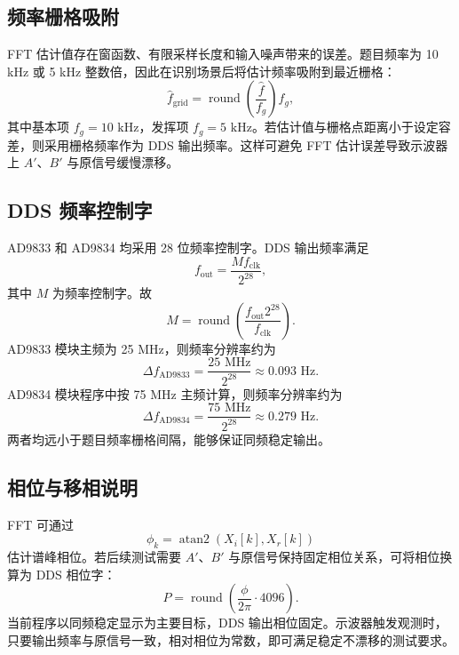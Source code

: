 \documentclass[UTF8,a4paper,zihao=-4]{ctexart}
\begin{document}
\subsection{频率栅格吸附}

FFT 估计值存在窗函数、有限采样长度和输入噪声带来的误差。题目频率为 10 kHz 或 5 kHz 整数倍，因此在识别场景后将估计频率吸附到最近栅格：
\begin{equation}
  \hat f_{\text{grid}}=\operatorname{round}\left(\frac{\hat f}{f_g}\right)f_g,
\end{equation}
其中基本项 $f_g=10\text{ kHz}$，发挥项 $f_g=5\text{ kHz}$。若估计值与栅格点距离小于设定容差，则采用栅格频率作为 DDS 输出频率。这样可避免 FFT 估计误差导致示波器上 $A'$、$B'$ 与原信号缓慢漂移。

\subsection{DDS 频率控制字}

AD9833 和 AD9834 均采用 28 位频率控制字。DDS 输出频率满足
\begin{equation}
  f_{\text{out}}=\frac{M f_{\text{clk}}}{2^{28}},
\end{equation}
其中 $M$ 为频率控制字。故
\begin{equation}
  M=\operatorname{round}\left(\frac{f_{\text{out}}2^{28}}{f_{\text{clk}}}\right).
\end{equation}
AD9833 模块主频为 25 MHz，则频率分辨率约为
\begin{equation}
  \Delta f_{\text{AD9833}}=\frac{25\text{ MHz}}{2^{28}}\approx0.093\text{ Hz}.
\end{equation}
AD9834 模块程序中按 75 MHz 主频计算，则频率分辨率约为
\begin{equation}
  \Delta f_{\text{AD9834}}=\frac{75\text{ MHz}}{2^{28}}\approx0.279\text{ Hz}.
\end{equation}
两者均远小于题目频率栅格间隔，能够保证同频稳定输出。

\subsection{相位与移相说明}

FFT 可通过
\begin{equation}
  \phi_k=\operatorname{atan2}(X_i[k],X_r[k])
\end{equation}
估计谱峰相位。若后续测试需要 $A'$、$B'$ 与原信号保持固定相位关系，可将相位换算为 DDS 相位字：
\begin{equation}
  P=\operatorname{round}\left(\frac{\phi}{2\pi}\cdot 4096\right).
\end{equation}
当前程序以同频稳定显示为主要目标，DDS 输出相位固定。示波器触发观测时，只要输出频率与原信号一致，相对相位为常数，即可满足稳定不漂移的测试要求。
\end{document}
